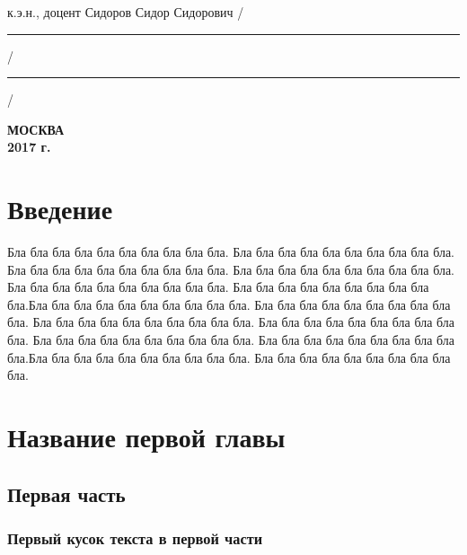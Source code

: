\documentclass[12pt, a4paper]{article}
\begin{document}
{\begin{titlepage}
\noindent
к.э.н., доцент Сидоров Сидор Сидорович
\hfill /\rule{6em}{0.5pt}/\rule{6em}{0.5pt}/

\hfill{}

%
%

\vfill

\begin{center}
\normalsize \bfseries МОСКВА \\ 2017 г.
\end{center}
\normalsize
\end{titlepage}
}

\newpage

\tableofcontents


\chapter*{Введение}

Бла бла бла бла бла бла бла бла бла бла. Бла бла бла бла бла бла бла бла бла бла. Бла бла бла бла бла бла бла бла бла бла. Бла бла бла бла бла бла бла бла бла бла. Бла бла бла бла бла бла бла бла бла бла. Бла бла бла бла бла бла бла бла бла бла.Бла бла бла бла бла бла бла бла бла бла. Бла бла бла бла бла бла бла бла бла бла. Бла бла бла бла бла бла бла бла бла бла. Бла бла бла бла бла бла бла бла бла бла. Бла бла бла бла бла бла бла бла бла бла. Бла бла бла бла бла бла бла бла бла бла.Бла бла бла бла бла бла бла бла бла бла. Бла бла бла бла бла бла бла бла бла бла.


\chapter{Название первой главы}

\thispagestyle{fancy}

\section{Первая часть}
\subsection{Первый кусок текста в первой части}
\end{document}
